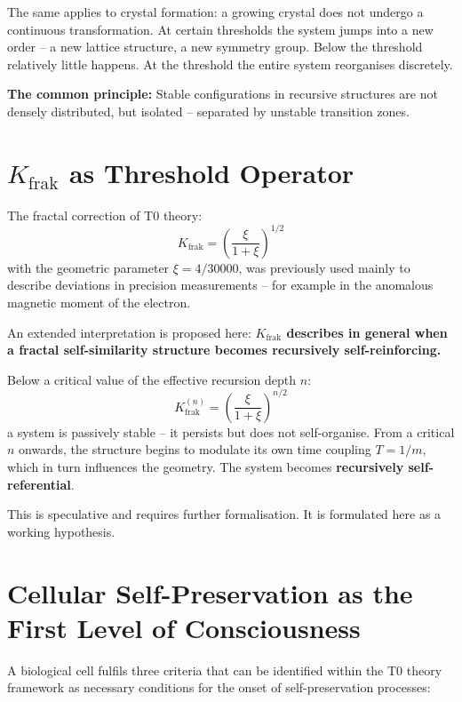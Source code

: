 	The same applies to crystal formation: a growing crystal does not undergo a continuous transformation. At certain thresholds the system jumps into a new order -- a new lattice structure, a new symmetry group. Below the threshold relatively little happens. At the threshold the entire system reorganises discretely.
	
	\textbf{The common principle:} Stable configurations in recursive structures are not densely distributed, but isolated -- separated by unstable transition zones.
	
	\section{$K_{\text{frak}}$ as Threshold Operator}
	
	The fractal correction of T0 theory:
	\begin{equation}
		K_{\text{frak}} = \left(\frac{\xi}{1+\xi}\right)^{1/2}
	\end{equation}
	with the geometric parameter $\xi = 4/30000$, was previously used mainly to describe deviations in precision measurements -- for example in the anomalous magnetic moment of the electron.
	
	An extended interpretation is proposed here: \textbf{$K_{\text{frak}}$ describes in general when a fractal self-similarity structure becomes recursively self-reinforcing.}
	
	Below a critical value of the effective recursion depth $n$:
	\begin{equation}
		K_{\text{frak}}^{(n)} = \left(\frac{\xi}{1+\xi}\right)^{n/2}
	\end{equation}
	a system is passively stable -- it persists but does not self-organise. From a critical $n$ onwards, the structure begins to modulate its own time coupling $T = 1/m$, which in turn influences the geometry. The system becomes \textbf{recursively self-referential}.
	
	This is speculative and requires further formalisation. It is formulated here as a working hypothesis.
	
	\section{Cellular Self-Preservation as the First Level of Consciousness}
	
	A biological cell fulfils three criteria that can be identified within the T0 theory framework as necessary conditions for the onset of self-preservation processes:
	
